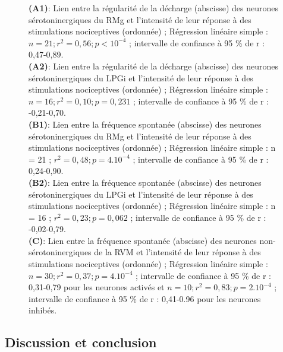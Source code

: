 \documentclass[a4paper,12pt,twoside]{report}
\begin{document}
\begin{figure}[p]
{\protect\parbox[t]{18cm}{
\begin{small}
\textbf{(A1)}: Lien entre la régularité de la décharge (abscisse) des neurones sérotoninergiques du RMg et l’intensité de leur réponse à des stimulations nociceptives (ordonnée) ; Régression linéaire simple : $n = 21 ; r^{2} = 0,56 ; p < 10^{-4}$ ; intervalle de confiance à 95 \% de r : 0,47-0,89.\\ 
\textbf{(A2)}: Lien entre la régularité de la décharge (abscisse) des neurones sérotoninergiques du LPGi et l’intensité de leur réponse à des stimulations nociceptives (ordonnée) ; Régression linéaire simple : $n = 16 ; r^{2} = 0,10 ; p = 0,231$ ; intervalle de confiance à 95 \% de r : -0,21-0,70.\\
\textbf{(B1)}: Lien entre la fréquence spontanée (abscisse) des neurones sérotoninergiques du RMg et l’intensité de leur réponse à des stimulations nociceptives (ordonnée) ; Régression linéaire simple : n = 21 ; $r^{2} = 0,48 ; p = 4.10^{-4}$ ; intervalle de confiance à 95 \% de r : 0,24-0,90.\\
\textbf{(B2)}: Lien entre la fréquence spontanée (abscisse) des neurones sérotoninergiques du LPGi et l’intensité de leur réponse à des stimulations nociceptives (ordonnée) ; Régression linéaire simple : n = 16 ; $r^{2} = 0,23 ; p = 0,062$ ; intervalle de confiance à 95 \% de r : -0,02-0,79.\\
\textbf{(C)}: Lien entre la fréquence spontanée (abscisse) des neurones non-sérotoninergiques de la RVM et l’intensité de leur réponse à des stimulations nociceptives (ordonnée) ; Régression linéaire simple : $n = 30 ; r^{2} = 0,37 ; p = 4.10^{-4}$ ; intervalle de confiance à 95 \% de r : 0,31-0,79 pour les neurones activés et $n = 10 ; r^{2} = 0,83 ; p = 2.10^{-4}$ ; intervalle de confiance à 95 \% de r : 0,41-0.96 pour les neurones inhibés.
\end{small}}}

\label{Figure 12}

\end{figure}

\subsection{Discussion et conclusion}
\end{document}
